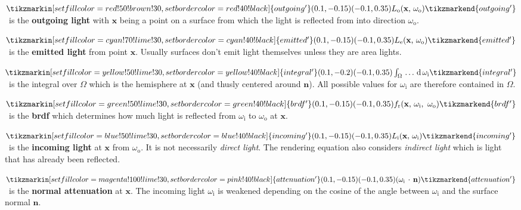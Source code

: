 \documentclass[
  twoside,
  11pt, a4paper,
  footinclude=true,
  headinclude=true,
  cleardoublepage=empty
]{scrreprt}
\begin{document}
\noindent
\(
        \tikzmarkin[set fill color=red!50!brown!30,set border color=red!40!black]{outgoing'}(0.1,-0.15)(-0.1,0.35)
        L_{\text{o}}(\mathbf x,\, \omega_{\text{o}})
        \tikzmarkend{outgoing'}
\)\, is the \textbf{outgoing light} with \(\mathbf x\) being a point on a surface from which the light is
reflected from into direction \(\omega_{\text{o}}\).

\noindent
\(
        \tikzmarkin[set fill color=cyan!70!lime!30,set border color=cyan!40!black]{emitted'}(0.1,-0.15)(-0.1,0.35)
        L_{\text{e}}(\mathbf x,\, \omega_{\text{o}})
        \tikzmarkend{emitted'}
\)\, is the \textbf{emitted light} from point \(\mathbf x\). Usually surfaces don't emit light themselves unless
they are area lights.

\noindent
\(
        \tikzmarkin[set fill color=yellow!50!lime!30,set border color=yellow!40!black]{integral'}(0.1,-0.2)(-0.1,0.35)
        \int_\Omega \, \ldots \, \operatorname d \omega_{\text{i}}
        \tikzmarkend{integral'}
\)\, is the integral over \(\Omega\) which is the hemisphere at \(\mathbf x\) (and thusly
centered around \(\mathbf n\)). All possible values for \(\omega_{\text{i}}\) are therefore
contained in \(\Omega\).

\noindent
\(
        \tikzmarkin[set fill color=green!50!lime!30,set border color=green!40!black]{brdf'}(0.1,-0.15)(-0.1,0.35)
            f_{\text{r}}(\mathbf x,\, \omega_{\text{i}},\ \omega_{\text{o}})
        \tikzmarkend{brdf'}
\)\, is the \textbf{\ac{brdf}} which determines how much light is reflected from
\(\omega_{\text{i}}\) to \(\omega_{\text{o}}\) at \(\mathbf x\).

\noindent
\(
        \tikzmarkin[set fill color=blue!50!lime!30,set border color=blue!40!black]{incoming'}(0.1,-0.15)(-0.1,0.35)
            L_{\text{i}}(\mathbf x,\, \omega_{\text{i}})
        \tikzmarkend{incoming'}
\)\, is the \textbf{incoming light} at \(\mathbf x\) from \(\omega_{\text{o}}\). It is not necessarily
\emph{direct light}. The rendering equation also considers \emph{indirect light} which is light that has already
been reflected.

\noindent
\(
        \tikzmarkin[set fill color=magenta!100!lime!30,set border color=pink!40!black]{attenuation'}(0.1,-0.15)(-0.1,0.35)
            (\omega_{\text{i}}\,\cdot\,\mathbf n)
        \tikzmarkend{attenuation'}
\)\, is the \textbf{normal attenuation} at \(\mathbf x\). The incoming light \(\omega_{\text{i}}\) is
weakened depending on the cosine of the angle between \(\omega_{\text{i}}\) and the surface normal
\(\mathbf n\).
\\
\end{document}
